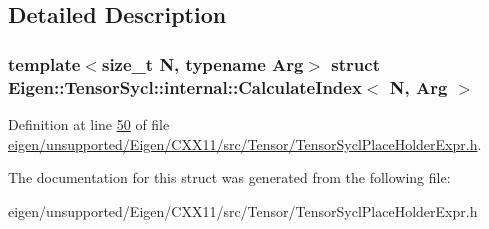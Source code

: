\subsection{Detailed Description}
\subsubsection*{template$<$size\+\_\+t N, typename Arg$>$\newline
struct Eigen\+::\+Tensor\+Sycl\+::internal\+::\+Calculate\+Index$<$ N, Arg $>$}



Definition at line \hyperlink{eigen_2unsupported_2_eigen_2_c_x_x11_2src_2_tensor_2_tensor_sycl_place_holder_expr_8h_source_l00050}{50} of file \hyperlink{eigen_2unsupported_2_eigen_2_c_x_x11_2src_2_tensor_2_tensor_sycl_place_holder_expr_8h_source}{eigen/unsupported/\+Eigen/\+C\+X\+X11/src/\+Tensor/\+Tensor\+Sycl\+Place\+Holder\+Expr.\+h}.



The documentation for this struct was generated from the following file\+:\begin{DoxyCompactItemize}
\item 
eigen/unsupported/\+Eigen/\+C\+X\+X11/src/\+Tensor/\+Tensor\+Sycl\+Place\+Holder\+Expr.\+h\end{DoxyCompactItemize}
